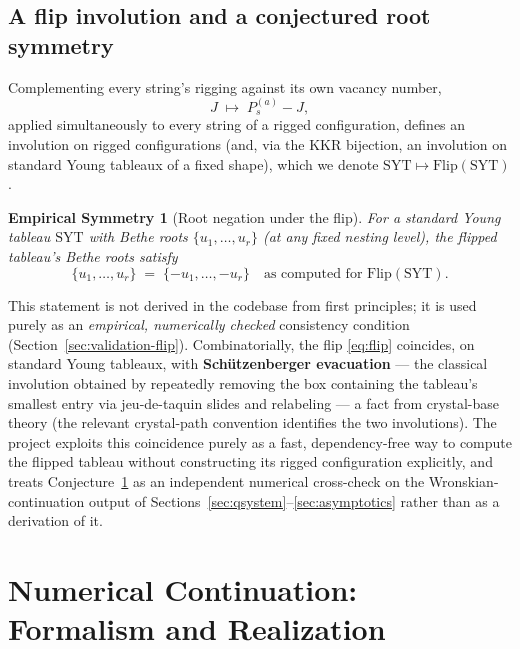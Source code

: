 \documentclass[11pt]{article}
\newtheorem{conjecture}{Empirical Symmetry}[section]
\begin{document}
\subsection{A flip involution and a conjectured root symmetry}
\label{sec:flip}

Complementing every string's rigging against its own vacancy number,
\begin{equation}
  \label{eq:flip}
  J \;\longmapsto\; P^{(a)}_s - J,
\end{equation}
applied simultaneously to every string of a rigged configuration, defines
an involution on rigged configurations (and, via the KKR bijection, an
involution on standard Young tableaux of a fixed shape), which we denote
$\mathrm{SYT}\mapsto\mathrm{Flip}(\mathrm{SYT})$.

\begin{conjecture}[Root negation under the flip]
\label{conj:flip}
For a standard Young tableau $\mathrm{SYT}$ with Bethe roots
$\{u_1,\dots,u_r\}$ (at any fixed nesting level), the flipped tableau's
Bethe roots satisfy
\begin{equation}
  \{u_1,\dots,u_r\} \;=\; \{-u_1,\dots,-u_r\}
  \quad\text{as computed for }\mathrm{Flip}(\mathrm{SYT}).
\end{equation}
\end{conjecture}

This statement is not derived in the codebase from first principles; it
is used purely as an \emph{empirical, numerically checked} consistency
condition (Section~\ref{sec:validation-flip}). Combinatorially, the flip
\eqref{eq:flip} coincides, on standard Young tableaux, with
\textbf{Sch\"utzenberger evacuation} --- the classical involution obtained
by repeatedly removing the box containing the tableau's smallest entry via
jeu-de-taquin slides and relabeling --- a fact from crystal-base theory
(the relevant crystal-path convention identifies the two involutions). The project exploits this coincidence
purely as a fast, dependency-free way to compute the flipped tableau
without constructing its rigged configuration explicitly, and treats
Conjecture~\ref{conj:flip} as an independent numerical cross-check on the
Wronskian-continuation output of Sections~\ref{sec:qsystem}--\ref{sec:asymptotics}
rather than as a derivation of it.


\section{Numerical Continuation: Formalism and Realization}
\label{sec:homotopy}
\end{document}
